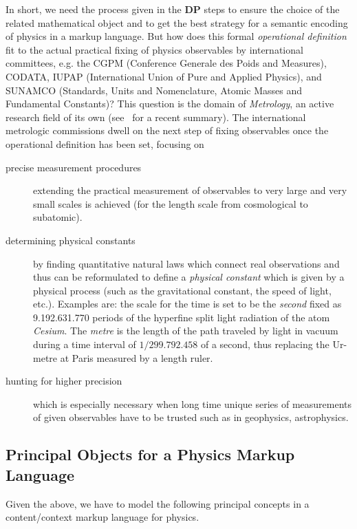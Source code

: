 In short, we need the process given in the {\bf{DP}} steps to ensure the choice of the
related mathematical object and to get the best strategy for a semantic encoding of
physics in a markup language. But how does this formal {\emph{operational definition}} fit
to the actual practical fixing of physics observables by international committees, e.g.
the CGPM (Conference Generale des Poids and Measures), CODATA, IUPAP (International Union
of Pure and Applied Physics), and SUNAMCO (Standards, Units and Nomenclature, Atomic
Masses and Fundamental Constants)? This question is the domain of {\emph{Metrology}}, an
active research field of its own (see~\cite{metrology} for a recent summary).  The
international metrologic commissions dwell on the next step of fixing observables once the
operational definition has been set, focusing on
\begin{description}
\item[precise measurement procedures] extending the practical measurement of observables
  to very large and very small scales is achieved (for the length scale from cosmological
  to subatomic).
\item[determining physical constants] by finding quantitative natural laws which connect
  real observations and thus can be reformulated to define a {\emph{physical constant}}
  which is given by a physical process (such as the gravitational constant, the speed of
  light, etc.).  Examples are: the scale for the time is set to be the {\emph{second}}
  fixed as 9.192.631.770 periods of the hyperfine split light radiation of the atom
  {\emph{Cesium}}.  The {\emph{metre}} is the length of the path traveled by light in
  vacuum during a time interval of $1/299.792.458$ of a second, thus replacing the
  Ur-metre at Paris measured by a length ruler.
\item[hunting for higher precision] which is especially necessary when long time unique
  series of measurements of given observables have to be trusted such as in geophysics,
  astrophysics.
\end{description}

\subsection{Principal Objects for a Physics Markup Language}

Given the above, we have to model the following principal concepts in a content/context
markup language for physics.

